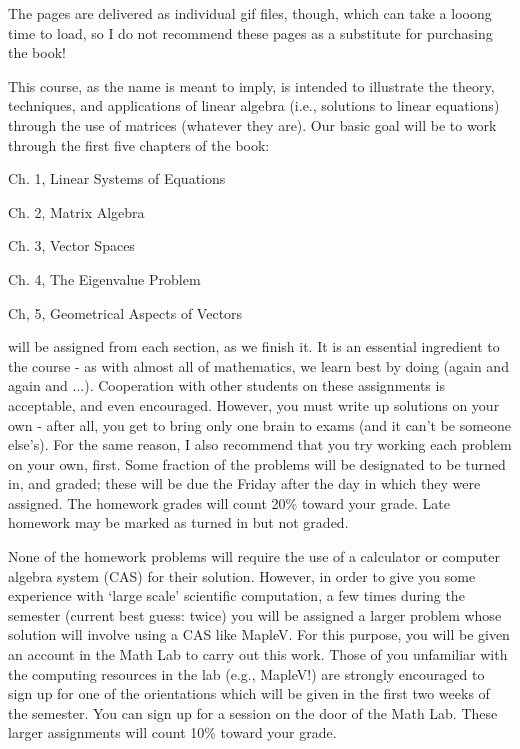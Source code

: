 \ni The pages are delivered as individual gif files, though, which
can take a looong time to load, so I do not recommend these
pages as a substitute for purchasing the book!

\msk

\ni This course, as the name is meant to imply, is intended to illustrate the 
theory, techniques, and applications of linear algebra (i.e., solutions to linear 
equations) through
the use of matrices (whatever they are).
Our basic goal will be to work through the first five chapters of the book:

\ssk

\ni\hsk Ch. 1, Linear Systems of Equations

\ni\hsk Ch. 2, Matrix Algebra

\ni\hsk Ch. 3, Vector Spaces

\ni\hsk Ch. 4, The Eigenvalue Problem

\ni\hsk Ch, 5, Geometrical Aspects of Vectors

\msk

 will be assigned from each section, as we finish it. 
It is an essential ingredient to the course - as with almost all of 
mathematics, we learn best by doing (again and again and ...). Cooperation 
with other students on these assignments is acceptable, and even 
encouraged. However, you must write up solutions on your own - after 
all, you get to bring only one brain to exams (and it can't be someone 
else's). For the same reason, I also recommend that you try working 
each problem on your own, first. Some fraction of the problems will be 
designated to be turned in, and graded; these will be due the Friday 
after the day in 
which they were assigned. The homework grades will 
count 20\% toward your grade.
Late homework may be marked as turned in but not graded.

\ssk

\ni None of the homework problems will require the use of a calculator or computer
algebra system (CAS) for their solution. However, in order to give you some 
experience with `large scale' scientific computation, a few times during the semester
(current best guess: twice) you will be assigned a larger problem whose solution
will involve using a CAS like MapleV. For this purpose, you will be given an account
in the Math Lab to carry out this work. Those of you unfamiliar with the computing 
resources in the lab (e.g., MapleV!) are strongly encouraged to sign up for one 
of the orientations
which will be given in the first two weeks of the semester. You can sign up for a session
on the door of the Math Lab. These larger assignments will count 10\% toward your grade.

